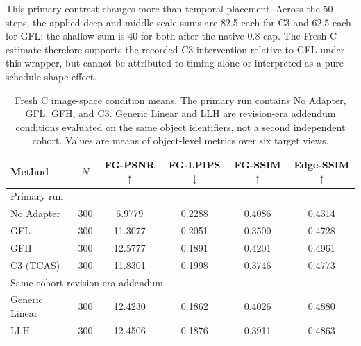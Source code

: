 \documentclass[times,twocolumn,final]{elsarticle}
\begin{document}
This primary contrast changes more than temporal placement. Across the 50 steps, the applied deep and middle scale sums are 82.5 each for C3 and 62.5 each for GFL; the shallow sum is 40 for both after the native 0.8 cap. The Fresh C estimate therefore supports the recorded C3 intervention relative to GFL under this wrapper, but cannot be attributed to timing alone or interpreted as a pure schedule-shape effect.

\begin{table}[t]
\centering
\caption{Fresh C image-space condition means. The primary run contains No Adapter, GFL, GFH, and C3. Generic Linear and LLH are revision-era addendum conditions evaluated on the same object identifiers, not a second independent cohort. Values are means of object-level metrics over six target views.}
\label{tab:freshc-absolute}
\scriptsize\setlength{\tabcolsep}{4pt}
\begin{tabular}{lccccc}
\toprule
Method & $N$ & FG-PSNR$\uparrow$ & FG-LPIPS$\downarrow$ & FG-SSIM$\uparrow$ & Edge-SSIM$\uparrow$ \\
\midrule
\multicolumn{6}{l}{Primary run} \\
No Adapter & 300 & 6.9779 & 0.2288 & 0.4086 & 0.4314 \\
GFL & 300 & 11.3077 & 0.2051 & 0.3500 & 0.4728 \\
GFH & 300 & 12.5777 & 0.1891 & 0.4201 & 0.4961 \\
C3 (TCAS) & 300 & 11.8301 & 0.1998 & 0.3746 & 0.4773 \\
\midrule
\multicolumn{6}{l}{Same-cohort revision-era addendum} \\
Generic Linear & 300 & 12.4230 & 0.1862 & 0.4026 & 0.4880 \\
LLH & 300 & 12.4506 & 0.1876 & 0.3911 & 0.4863 \\
\bottomrule
\end{tabular}
\end{table}
\end{document}
